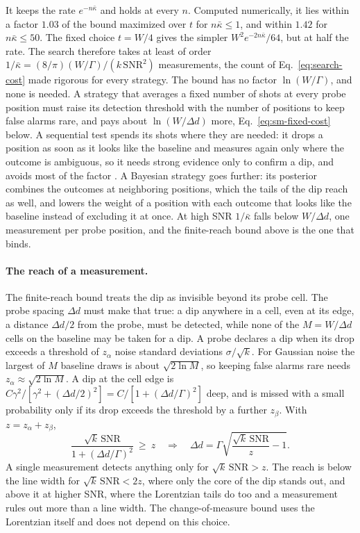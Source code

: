 It keeps the rate $e^{-n\bar\kappa}$ and holds at every $n$. Computed
numerically, it lies within a factor $1.03$ of the bound maximized over $t$ for $n\bar\kappa\le1$, and within $1.42$
for $n\bar\kappa\le50$. The fixed choice $t=W/4$ gives the simpler $W^2e^{-2n\bar\kappa}/64$, but at half the rate.
The search therefore takes at least of order
$1/\bar\kappa=(8/\pi)(W/\Gamma)/(k\,\mathrm{SNR}^2)$ measurements, the count of Eq.~\eqref{eq:search-cost} made
rigorous for every strategy. The bound has
no factor $\ln(W/\Gamma)$, and none is needed. A strategy that averages a fixed number of shots at every probe
position must raise its detection threshold with the number of positions to keep false alarms rare, and pays about
$\ln(W/\Delta d)$ more, Eq.~\eqref{eq:sm-fixed-cost} below. A sequential test spends its shots where they are
needed: it drops a position as soon as it looks like the baseline and measures again only where the outcome is
ambiguous, so it needs strong evidence only to confirm a dip, and avoids most of the factor \cite{malloy2014}. A
Bayesian strategy goes further: its posterior combines the outcomes at neighboring positions, which the tails of the
dip reach as well, and lowers the weight of a position with each outcome that looks like the baseline instead of
excluding it at once. At high SNR $1/\bar\kappa$ falls below $W/\Delta d$, one measurement per probe position, and the
finite-reach bound above is the one that binds.

\paragraph{The reach of a measurement.} The finite-reach bound treats the dip as invisible beyond its probe cell.
The probe spacing $\Delta d$ must make that true: a dip anywhere in a cell, even at its edge, a distance
$\Delta d/2$ from the probe, must be detected, while none of the $M=W/\Delta d$ cells on the baseline may be taken
for a dip. A probe declares a dip when its drop exceeds a threshold of $z_\alpha$ noise standard deviations
$\sigma/\sqrt k$. For Gaussian noise the largest of $M$ baseline draws is about $\sqrt{2\ln M}$, so keeping false
alarms rare needs $z_\alpha\approx\sqrt{2\ln M}$. A dip at the cell edge is
$C\gamma^2/[\gamma^2+(\Delta d/2)^2]=C/[1+(\Delta d/\Gamma)^2]$ deep, and is missed with a small probability only if
its drop exceeds the threshold by a further $z_\beta$. With $z=z_\alpha+z_\beta$,
\begin{equation}
  \frac{\sqrt k\,\mathrm{SNR}}{1+(\Delta d/\Gamma)^2}\ \ge\ z
  \quad\Longrightarrow\quad
  \Delta d=\Gamma\sqrt{\frac{\sqrt k\,\mathrm{SNR}}{z}-1}.
  \label{eq:sm-reach}
\end{equation}
A single measurement detects anything only for $\sqrt k\,\mathrm{SNR}>z$. The reach is below the line width for
$\sqrt k\,\mathrm{SNR}<2z$, where only the core of the dip stands out, and above it at higher SNR, where the
Lorentzian tails do too and a measurement rules out more than a line width. The change-of-measure bound uses the
Lorentzian itself and does not depend on this choice.

